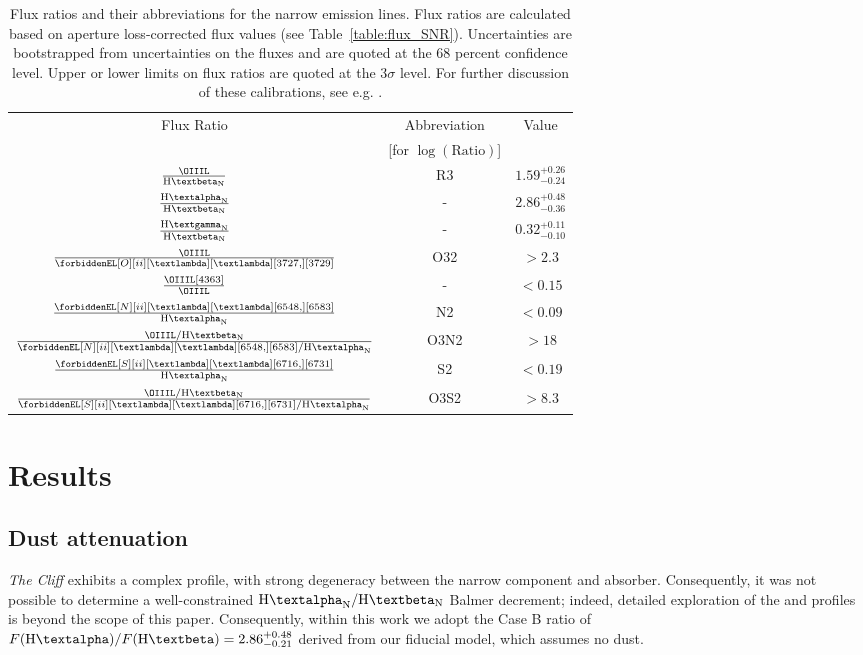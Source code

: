 \documentclass[fleqn,usenatbib]{mnras}
\newcommand{\Halpha}{\text{H\textalpha}\xspace}
\newcommand{\Hbeta}{\text{H\textbeta}\xspace}
\newcommand{\Hgamma}{\text{H\textgamma}\xspace}
\newcommand{\OIIall}{\forbiddenEL[O][ii][\textlambda][\textlambda][3727,][3729]}
\newcommand{\SIIall}{\forbiddenEL[S][ii][\textlambda][\textlambda][6716,][6731]}
\newcommand{\NIIall}{\forbiddenEL[N][ii][\textlambda][\textlambda][6548,][6583]}
\newcommand{\cliff}{\textit{The Cliff}\xspace}
\begin{document}
{\renewcommand{\arraystretch}{1.6}
\begin{table}
\normalsize
\centering
 \begin{tabular}{c c|| c} 
 \hline
 \hline
 Flux Ratio & Abbreviation & Value \\ 
  & [for $\log(\mathrm{Ratio})$]&  \\
 \hline
 $\frac{\OIIIL}{\Hbeta_\mathrm{N}}$ & R3 & $1.59^{+0.26}_{-0.24}$ \\
 $\frac{\Halpha_\mathrm{N}}{\Hbeta_\mathrm{N}}$ & - &  $2.86^{+0.48}_{-0.36}$\\
 $\frac{\Hgamma_\mathrm{N}}{\Hbeta_\mathrm{N}}$ & - &  $0.32^{+0.11}_{-0.10}$\\
 $\frac{\OIIIL}{\OIIall}$ & O32 & $>2.3$ \\
 $\frac{\OIIIL[4363]}{\OIIIL}$ & - & $<0.15$ \\
 $\frac{\NIIall}{\Halpha_\mathrm{N}}$ & N2 & $<0.09$ \\
 $\frac{\OIIIL/\Hbeta_\mathrm{N}}{\NIIall/\Halpha_\mathrm{N}}$ & O3N2 & $>18$ \\
 $\frac{\SIIall}{\Halpha_\mathrm{N}}$ & S2 & $<0.19$ \\
 $\frac{\OIIIL/\Hbeta_\mathrm{N}}{\SIIall/\Halpha_\mathrm{N}}$ & O3S2 & $>8.3$\\
 \hline
 \hline
 \end{tabular}
 \caption{Flux ratios and their abbreviations for the narrow emission lines. 
 Flux ratios are calculated based on aperture loss-corrected flux values (see Table~\ref{table:flux_SNR}). 
 Uncertainties are bootstrapped from uncertainties on the fluxes and are quoted at the 68 percent confidence level. 
 Upper or lower limits on flux ratios are quoted at the $3\sigma$ level.
 For further discussion of these calibrations, see e.g. \citealt{Curti2020}.}
 \label{table:flux_ratios}
\end{table}
}

\section{Results}\label{sec:Results}

\subsection{Dust attenuation}\label{sec:Dust_extinction}
\cliff exhibits a complex \Halpha profile, with strong degeneracy between the narrow component and absorber. 
Consequently, it was not possible to determine a well-constrained $\Halpha_\mathrm{N}/\Hbeta_\mathrm{N}$ Balmer decrement; indeed, detailed exploration of the \Halpha and \Hbeta profiles is beyond the scope of this paper. 
Consequently, within this work we adopt the Case B ratio of  $F(\Halpha)/F(\Hbeta) = 2.86^{+0.48}_{-0.21}$ derived from our fiducial \Halpha model, which assumes no dust.
\end{document}
